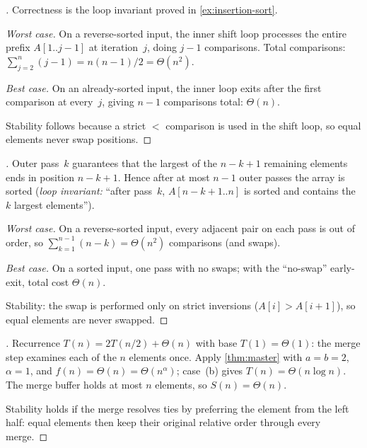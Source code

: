 \begin{proof}[]
Correctness is the loop invariant proved in
\cref{ex:insertion-sort}.

\emph{Worst case.} On a reverse-sorted input, the inner shift loop
processes the entire prefix $A[1..j-1]$ at iteration~$j$, doing
$j - 1$ comparisons. Total comparisons:
$\sum_{j=2}^{n} (j - 1) = n(n - 1)/2 = \Theta(n^2)$.

\emph{Best case.} On an already-sorted input, the inner loop exits
after the first comparison at every~$j$, giving $n - 1$ comparisons
total: $\Theta(n)$.

Stability follows because a strict $<$ comparison is used in the
shift loop, so equal elements never swap positions.
\end{proof}

\begin{proof}[]
Outer pass~$k$ guarantees that the largest of the $n - k + 1$
remaining elements ends in position $n - k + 1$. Hence after at
most $n - 1$ outer passes the array is sorted (\emph{loop invariant:}
``after pass~$k$, $A[n - k + 1 .. n]$ is sorted and contains the
$k$ largest elements'').

\emph{Worst case.} On a reverse-sorted input, every adjacent pair on
each pass is out of order, so $\sum_{k=1}^{n-1} (n - k) = \Theta(n^2)$
comparisons (and swaps).

\emph{Best case.} On a sorted input, one pass with no swaps; with the
``no-swap'' early-exit, total cost $\Theta(n)$.

Stability: the swap is performed only on strict inversions
($A[i] > A[i+1]$), so equal elements are never swapped.
\end{proof}

\begin{proof}[]
Recurrence $T(n) = 2 T(n/2) + \Theta(n)$ with base $T(1) = \Theta(1)$:
the merge step examines each of the $n$ elements once. Apply
\cref{thm:master} with $a = b = 2$, $\alpha = 1$, and
$f(n) = \Theta(n) = \Theta(n^\alpha)$; case~(b) gives
$T(n) = \Theta(n \log n)$. The merge buffer holds at most $n$
elements, so $S(n) = \Theta(n)$.

Stability holds if the merge resolves ties by preferring the element
from the left half: equal elements then keep their original relative
order through every merge.
\end{proof}

